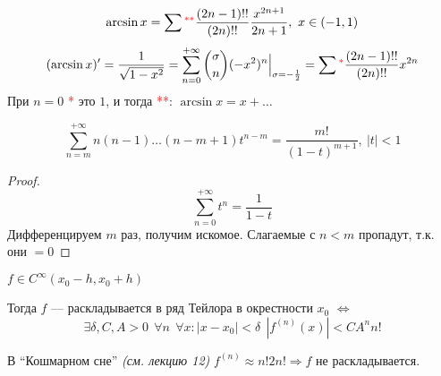 \begin{corollary}
    \[\arcsin x = \sum {}^{\textcolor{red}{**}} \frac{(2n - 1)!!}{(2n)!!} \frac{x^{2n + 1}}{2n + 1},\ x\in( - 1, 1)\]
    \[(\arcsin x)' = \frac{1}{\sqrt{1 - x^2}} = \sum_{n = 0}^{ +\infty} \binom{\sigma}{n} ( - x^2)^n\Big|_{\sigma =- \frac{1}{2}} = \sum {}^{\textcolor{red}{*}} \frac{(2n - 1)!!}{(2n)!!}x^{2n}\]
    При \(n = 0\) \textcolor{red}{*} это \(1\), и тогда \textcolor{red}{**}: \(\arcsin x = x + \dots \)
\end{corollary}

\begin{corollary}
    \[\sum_{n = m}^{ +\infty} n(n - 1)\dots (n - m + 1)t^{n - m} = \frac{m!}{(1 - t)^{m + 1}},\ |t|< 1\]
\end{corollary}
\begin{proof}
    \[\sum_{n = 0}^{ +\infty} t^n = \frac{1}{1 - t}\]
    Дифференцируем \(m\) раз, получим искомое. Слагаемые с \(n < m\) пропадут, т.к. они \( = 0\)
\end{proof}

\begin{theorem}
    \(f\in C^{\infty} (x_0 - h, x_0 + h)\)

    Тогда \(f\) --- раскладывается в ряд Тейлора в окрестности \(x_0\) \(\iff\)
    \[\exists \delta, C, A > 0 \ \ \forall n \ \ \forall x : |x - x_0| < \delta \ \ |f^{(n)}(x)| < C A^n n!\]
\end{theorem}

\begin{remark}
    В ``Кошмарном сне'' \textit{(см. лекцию 12)} \(f^{(n)} \approx n! 2n! \Rightarrow f\) не раскладывается.
\end{remark}

